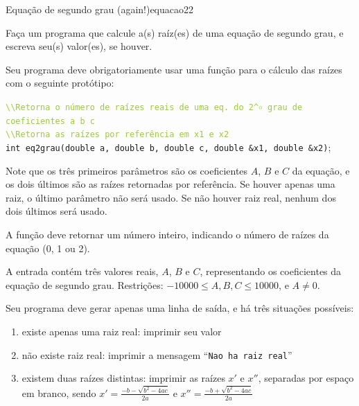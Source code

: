 \documentclass[12pt,a4paper,oneside]{article}
\begin{document}
\begin{problem}{Equação de segundo grau (again!)}{equacao2}{2}
 
Faça um programa que calcule a(s) raíz(es) de uma equação de segundo grau, e escreva seu(s) valor(es), se houver.

Seu programa deve obrigatoriamente usar uma função para o cálculo das raízes com o seguinte protótipo:

\texttt{\textcolor{YellowGreen}{\textbackslash\textbackslash Retorna o número de raízes reais de uma eq. do 2^$\circ$ grau de coeficientes a b c}}\\
\texttt{\textcolor{YellowGreen}{\textbackslash\textbackslash Retorna as raízes por referência em x1 e x2}}\\
\texttt{\textcolor{Mulberry}{int} eq2grau(\textcolor{Mulberry}{double} a, \textcolor{Mulberry}{double} b, \textcolor{Mulberry}{double} c, \textcolor{Mulberry}{double \&}x1, \textcolor{Mulberry}{double \&}x2)};

Note que os três primeiros parâmetros são os coeficientes $A$, $B$ e $C$ da equação, e os dois últimos são as raízes retornadas por referência. Se houver apenas uma raiz, o último parâmetro não será usado. Se não houver raiz real, nenhum dos dois últimos será usado.

A função deve retornar um número inteiro, indicando o número de raízes da equação (0, 1 ou 2).

%

\InputFile

A entrada contém três valores reais, $A$, $B$ e $C$, representando os coeficientes da equação de segundo grau. Restrições: $-10000 \leq A,B,C \leq 10000$, e $A \neq 0$.



\OutputFile

Seu programa deve gerar apenas uma linha de saída, e há três situações possíveis:

\begin{enumerate}
    \item existe apenas uma raiz real: imprimir seu valor
    \item não existe raiz real: imprimir a mensagem ``\texttt{Nao ha raiz real}''
    \item existem duas raízes distintas: imprimir as raízes $x'$ e $x''$, separadas por espaço em branco, sendo $x' = \frac{-b-\sqrt{b^2 -4ac}}{2a}$ e $x'' = \frac{-b+\sqrt{b^2 -4ac}}{2a}$
\end{enumerate}


\end{problem}
\end{document}
